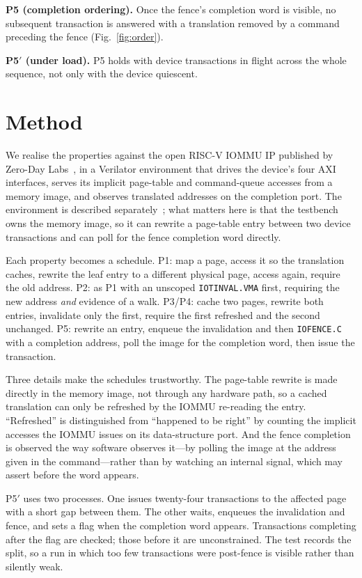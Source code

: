 \documentclass[conference]{IEEEtran}
\newcommand{\cmd}[1]{\mbox{\texttt{#1}}}
\begin{document}
\textbf{P5 (completion ordering).} Once the fence's completion word is visible,
no subsequent transaction is answered with a translation removed by a command
preceding the fence (Fig.~\ref{fig:order}).

\textbf{P5$'$ (under load).} P5 holds with device transactions in flight across
the whole sequence, not only with the device quiescent.

\section{Method}
We realise the properties against the open RISC-V IOMMU IP published by
Zero-Day Labs~\cite{rviommu}, in a Verilator environment that drives the
device's four AXI interfaces, serves its implicit page-table and command-queue
accesses from a memory image, and observes translated addresses on the
completion port. The environment is described separately~\cite{companion}; what
matters here is that the testbench owns the memory image, so it can rewrite a
page-table entry between two device transactions and can poll for the fence
completion word directly.

Each property becomes a schedule. P1: map a page, access it so the translation
caches, rewrite the leaf entry to a different physical page, access again,
require the old address. P2: as P1 with an unscoped \cmd{IOTINVAL.VMA}
first, requiring the new address \emph{and} evidence of a walk. P3/P4: cache two
pages, rewrite both entries, invalidate only the first, require the first
refreshed and the second unchanged. P5: rewrite an entry, enqueue the
invalidation and then \cmd{IOFENCE.C} with a completion address, poll the
image for the completion word, then issue the transaction.

Three details make the schedules trustworthy. The page-table rewrite is made
directly in the memory image, not through any hardware path, so a cached
translation can only be refreshed by the IOMMU re-reading the entry.
``Refreshed'' is distinguished from ``happened to be right'' by counting the
implicit accesses the IOMMU issues on its data-structure port. And the fence
completion is observed the way software observes it---by polling the image at
the address given in the command---rather than by watching an internal signal,
which may assert before the word appears.

P5$'$ uses two processes. One issues twenty-four transactions to the affected
page with a short gap between them. The other waits, enqueues the invalidation
and fence, and sets a flag when the completion word appears. Transactions
completing after the flag are checked; those before it are unconstrained. The
test records the split, so a run in which too few transactions were post-fence
is visible rather than silently weak.
\end{document}
